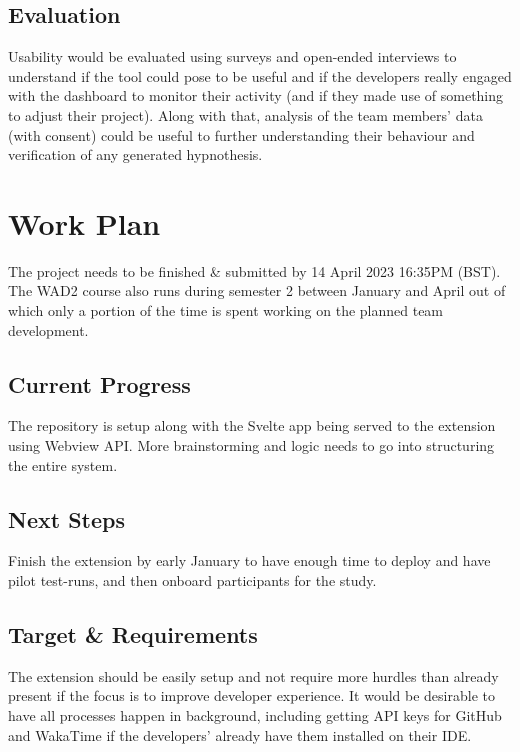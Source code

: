\documentclass{mprop}
\begin{document}
\subsection{Evaluation}

Usability would be evaluated using surveys and open-ended interviews to understand if the tool could pose to be useful and if the developers really engaged with the dashboard to monitor their activity (and if they made use of something to adjust their project). Along with that, analysis of the team members' data (with consent) could be useful to further understanding their behaviour and verification of any generated hypnothesis. 

\newpage
\section{Work Plan}


The project needs to be finished \& submitted by 14 April 2023 16:35PM (BST). The WAD2 course also runs during semester 2 between January and April out of which only a portion of the time is spent working on the planned team development.

\subsection{Current Progress}

The repository is setup along with the Svelte app being served to the extension using Webview API. More brainstorming and logic needs to go into structuring the entire system.

\subsection{Next Steps}

Finish the extension by early January to have enough time to deploy and have pilot test-runs, and then onboard participants for the study.

\subsection{Target \& Requirements}

The extension should be easily setup and not require more hurdles than already present if the focus is to improve developer experience. It would be desirable to have all processes happen in background, including getting API keys for GitHub and WakaTime if the developers' already have them installed on their IDE.
\end{document}
